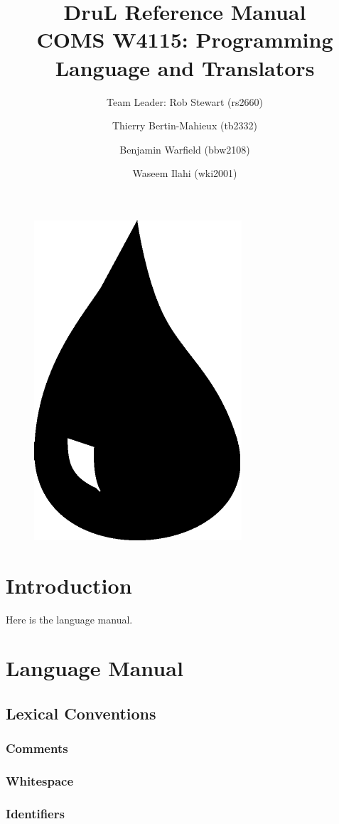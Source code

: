 \documentclass[11pt,twoside]{article}
\title{\textbf{DruL} Reference Manual\\
\vspace{1cm}
COMS W4115: Programming Language and Translators}
\author{Team Leader: Rob Stewart (rs2660) \and Thierry Bertin-Mahieux (tb2332) \and Benjamin Warfield (bbw2108) \and Waseem Ilahi (wki2001)}
\begin{document}
\maketitle
\begin{center}
\end{center}

\vspace{3cm}

\begin{figure}[h]
\begin{center}
\includegraphics[width=.2\columnwidth]{Water_Drop.pdf}
\end{center}
\end{figure}


\newpage


\section{Introduction}
Here is the language manual.


\section{Language Manual}

\subsection{Lexical Conventions}

\subsubsection{Comments}

\subsubsection{Whitespace}

\subsubsection{Identifiers}
\end{document}
